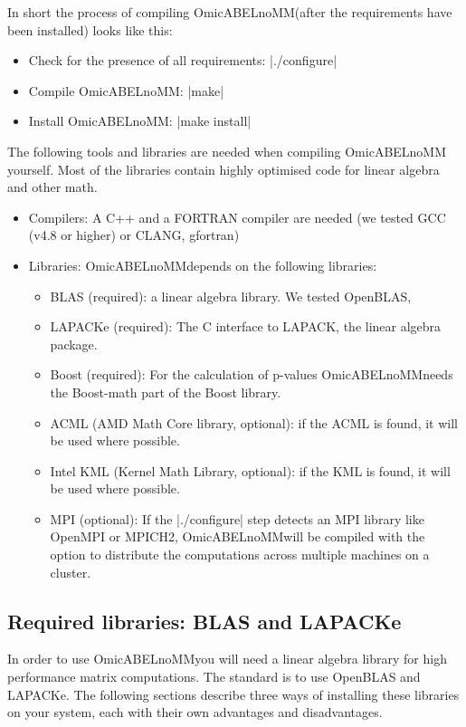 \documentclass{report}
\newcommand{\oanomm}{OmicABELnoMM}
\begin{document}
In short the process of compiling \oanomm (after the requirements have
been installed) looks like this:
\begin{itemize}
\item Check for the presence of all requirements: |./configure|
\item Compile \oanomm: |make|
\item Install \oanomm: |make install|
\end{itemize}

The following tools and libraries are needed when compiling \oanomm
yourself. Most of the libraries contain highly optimised code for
linear algebra and other math.
\begin{itemize}
\item Compilers: A C++ and a FORTRAN compiler are needed (we tested
  GCC (v4.8 or higher) or CLANG, gfortran)
\item Libraries: \oanomm depends on the following libraries:
  \begin{itemize}
  \item \acs{BLAS} (required): a linear algebra library. We tested OpenBLAS,
  \item LAPACKe (required): The C interface to LAPACK, the linear
    algebra package.
  \item Boost (required): For the calculation of p-values \oanomm needs the
    Boost-math part of the Boost library.
  \item ACML (AMD Math Core library, optional): if the ACML is found,
    it will be used where possible.
  \item Intel KML (Kernel Math Library, optional): if the KML is
    found, it will be used where possible.
  \item \acs{MPI} (optional): If the |./configure| step detects an
    \acf{MPI} library like OpenMPI or MPICH2, \oanomm will be compiled
    with the option to distribute the computations across multiple
    machines on a cluster.
  \end{itemize}
\end{itemize}


\subsection{Required libraries: \ac{BLAS} and LAPACKe}
In order to use \oanomm you will need a linear algebra library for
high performance matrix computations. The standard is to use OpenBLAS
and LAPACKe. The following sections describe three ways of installing
these libraries on your system, each with their own advantages and
disadvantages.
\end{document}
